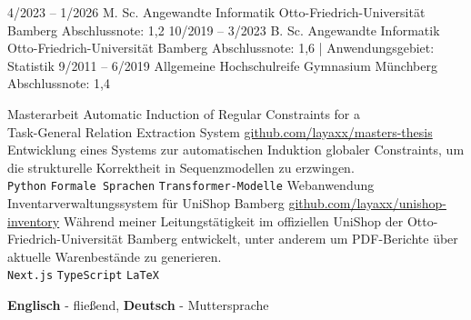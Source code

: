 \documentclass[9pt]{developercv} %
\begin{document}
\vspace{-10 pt}
\begin{entrylist}
	\entry
	{4/2023 -- 1/2026}
	{M. Sc. Angewandte Informatik}
	{Otto-Friedrich-Universität Bamberg}
	{Abschlussnote: 1,2}
	\entry
	{10/2019 -- 3/2023}
	{B. Sc. Angewandte Informatik}
	{Otto-Friedrich-Universität Bamberg}
	{Abschlussnote: 1,6 | Anwendungsgebiet: Statistik}
	\entry
	{9/2011 -- 6/2019}
	{Allgemeine Hochschulreife}
	{Gymnasium Münchberg}
	{Abschlussnote: 1,4}
\end{entrylist}

\vspace{-10 pt}
\begin{entrylist}
	\entry
	{Masterarbeit}
	{Automatic Induction of Regular Constraints for a\\ Task-General Relation Extraction System}
	{\href{https://github.com/layaxx/masters-thesis}{github.com/layaxx/masters-thesis}}
	{Entwicklung eines Systems zur automatischen Induktion globaler Constraints, um die strukturelle Korrektheit in Sequenzmodellen zu erzwingen.\\
		\texttt{Python} \slashsep \texttt{Formale Sprachen} \slashsep \texttt{Transformer-Modelle}}
	\entry
	{Webanwendung}
	{Inventarverwaltungssystem für UniShop Bamberg}
	{\href{https://github.com/layaxx/unishop-inventory}{github.com/layaxx/unishop-inventory}}
	{Während meiner Leitungstätigkeit im offiziellen UniShop der Otto-Friedrich-Universität Bamberg entwickelt, unter anderem um PDF-Berichte über aktuelle Warenbestände zu generieren.\\
		\texttt{Next.js} \slashsep \texttt{TypeScript} \slashsep \texttt{LaTeX}}
\end{entrylist}
\vspace{-10 pt}
\vspace{-6pt}

\hspace{26mm} \textbf{Englisch} - fließend, \textbf{ Deutsch} - Muttersprache

\end{document}
